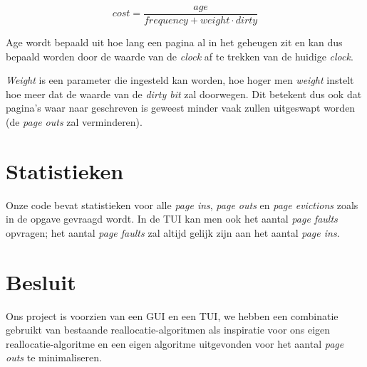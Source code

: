 \documentclass[a4paper,12pt]{article}
\begin{document}
\[
cost = \frac{age}{frequency + weight \cdot dirty}
\]

Age wordt bepaald uit hoe lang een pagina al in het geheugen zit en kan dus bepaald worden door de waarde van de \textit{clock} af te trekken van de huidige \textit{clock}.

\textit{Weight} is een parameter die ingesteld kan worden, hoe hoger men \textit{weight} instelt hoe meer dat de waarde van de \textit{dirty bit} zal doorwegen. Dit betekent dus ook dat pagina's waar naar geschreven is geweest minder vaak zullen uitgeswapt worden (de \textit{page outs} zal verminderen).

\section{Statistieken}
Onze code bevat statistieken voor alle \textit{page ins}, \textit{page outs} en \textit{page evictions} zoals in de opgave gevraagd wordt. In de TUI kan men ook het aantal \textit{page faults} opvragen; het aantal \textit{page faults} zal altijd gelijk zijn aan het aantal \textit{page ins}.

\section{Besluit}
Ons project is voorzien van een GUI en een TUI, we hebben een combinatie gebruikt van bestaande reallocatie-algoritmen als inspiratie voor ons eigen reallocatie-algoritme en een eigen algoritme uitgevonden voor het aantal \textit{page outs} te minimaliseren.
\end{document}
